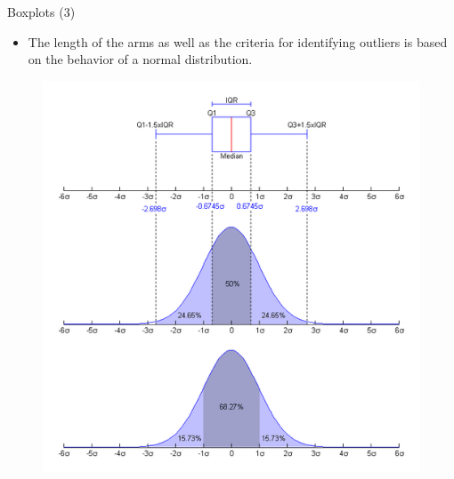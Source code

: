 \documentclass[handout]{beamer}
\begin{document}
\begin{frame}{Boxplots (3)}
\scriptsize{
\begin{itemize}
 \item The length of the arms as well as the criteria for identifying outliers is based on the behavior of a normal distribution.
\end{itemize}

\begin{figure}[h!]
	\centering
	\includegraphics[scale=0.35]{pics/Boxplot_vs_PDF.png}
	
	
	
\end{figure} 
}
\end{frame}
\end{document}
